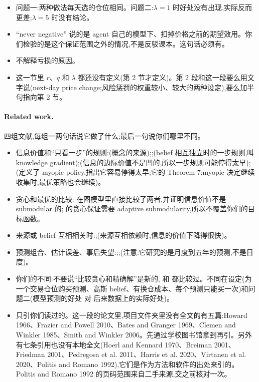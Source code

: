 \documentclass{article}
\newif\ifnotes
\newenvironment{pts}{\begin{itemize}[nosep,leftmargin=1.15em,topsep=1pt]}{\end{itemize}}
\begin{document}
\begin{note}
\begin{pts}
\item 问题一:两种做法每天选的仓位相同。问题二:$\lambda=1$ 时好处没有出现,实际反而更差;$\lambda=5$ 时没有结论。
\item ``never negative'' 说的是 agent 自己的模型下、扣掉价格之前的期望效用。你们检验的是这个保证范围之外的情况,不是反驳课本。这句话必须有。
\item 不解释亏损的原因。
\item 这一节里 $r$、$q$ 和 $\lambda$ 都还没有定义(第 2 节才定义)。第 2 段和这一段要么用文字说(next-day price change;风险惩罚的权重较小、较大的两种设定),要么加半句指向第 2 节。
\end{pts}
\end{note}

\paragraph{Related work.}\ifnotes\mbox{}\par\vspace{-3pt}\fi
\begin{note}
四组文献,每组一两句话说它做了什么;最后一句说你们哪里不同。
\begin{pts}
\item 信息价值和``只看一步''的规则:\citet{howard1966information}(概念的来源);\citet{russell1991principles};\citet{frazier2008kg}(belief 相互独立时的一步规则,叫 knowledge gradient);\citet{frazier2010paradoxes}(信息的边际价值不是凹的,所以一步规则可能停得太早);\citet{hay2012selecting}(定义了 myopic policy,指出它容易停得太早;它的 Theorem 7:myopic 决定继续收集时,最优策略也会继续)。
\item 贪心和最优的比较:\citet{krause2009optimal} 在图模型里直接比较了两者,并证明信息价值不是 submodular 的;\citet{golovin2011adaptive} 的贪心保证需要 adaptive submodularity,所以不覆盖你们的目标函数。
\item 来源或 belief 互相相关时:\citet{frazier2009correlated};\citet{clemen1985limits}(来源互相依赖时,信息的价值下降得很快)。
\item 预测组合、估计误差、事后失望:\citet{bates1969combination};\citet{smith2006optimizer};\citet{welch2008comprehensive}(注意:它研究的是月度到五年的预测,不是日度)。
\item 你们的不同:不要说``比较贪心和精确解''是新的,\citet{krause2009optimal} 和 \citet{hay2012selecting} 都比较过。不同在设定(为一个交易仓位购买预测、高斯 belief、有换仓成本、每个预测只能买一次)和问题二(模型预测的好处 对 后来数据上的实际好处)。
\item 只引你们读过的。这一段的论文里,项目文件夹里没有全文的有五篇:Howard 1966、Frazier and Powell 2010、Bates and Granger 1969、Clemen and Winkler 1985、Smith and Winkler 2006。先通过学校图书馆拿到再引。另外有七条引用也没有本地全文(Hoerl and Kennard 1970、Breiman 2001、Friedman 2001、Pedregosa et al. 2011、Harris et al. 2020、Virtanen et al. 2020、Politis and Romano 1992),它们是作为方法和软件的出处来引的。Politis and Romano 1992 的页码范围来自二手来源,交之前核对一次。
\end{pts}
\end{note}
\end{document}
